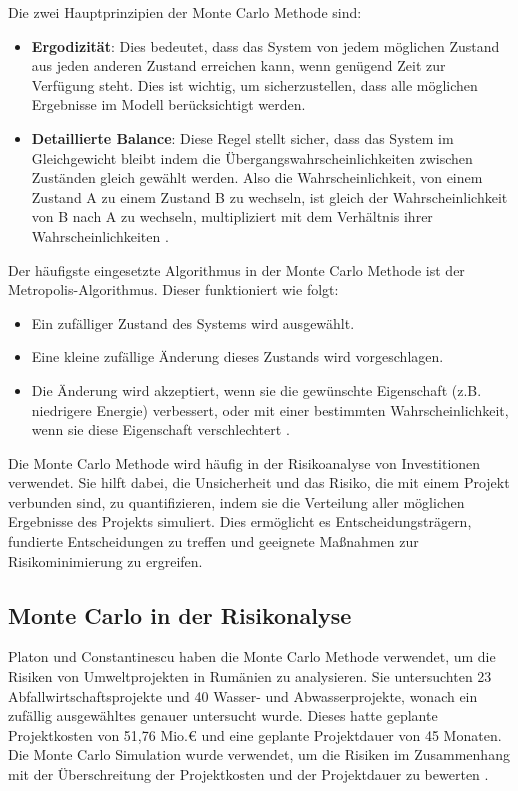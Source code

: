 Die zwei Hauptprinzipien der Monte Carlo Methode sind:

\begin{itemize}
    \item \textbf{Ergodizität}: Dies bedeutet, dass das System von jedem möglichen Zustand aus jeden anderen Zustand erreichen kann, wenn genügend Zeit zur Verfügung steht. Dies ist wichtig, um sicherzustellen, dass alle möglichen Ergebnisse im Modell berücksichtigt werden.
    \item \textbf{Detaillierte Balance}: Diese Regel stellt sicher, dass das System im Gleichgewicht bleibt indem die Übergangswahrscheinlichkeiten zwischen Zuständen gleich gewählt werden. Also die Wahrscheinlichkeit, von einem Zustand A zu einem Zustand B zu wechseln, ist gleich der Wahrscheinlichkeit von B nach A zu wechseln, multipliziert mit dem Verhältnis ihrer Wahrscheinlichkeiten \cite{Walter2014}.
\end{itemize}

Der häufigste eingesetzte Algorithmus in der Monte Carlo Methode ist der Metropolis-Algorithmus. Dieser funktioniert wie folgt:

\begin{itemize}
    \item Ein zufälliger Zustand des Systems wird ausgewählt.
    \item Eine kleine zufällige Änderung dieses Zustands wird vorgeschlagen.
    \item Die Änderung wird akzeptiert, wenn sie die gewünschte Eigenschaft (z.B. niedrigere Energie) verbessert, oder mit einer bestimmten Wahrscheinlichkeit, wenn sie diese Eigenschaft verschlechtert \cite{Walter2014}.
\end{itemize}

Die Monte Carlo Methode wird häufig in der Risikoanalyse von Investitionen verwendet. Sie hilft dabei, die Unsicherheit und das Risiko, die mit einem Projekt verbunden sind, zu quantifizieren, indem sie die Verteilung aller möglichen Ergebnisse des Projekts simuliert. Dies ermöglicht es Entscheidungsträgern, fundierte Entscheidungen zu treffen und geeignete Maßnahmen zur Risikominimierung zu ergreifen.

\subsection{Monte Carlo in der Risikonalyse}

Platon und Constantinescu haben die Monte Carlo Methode verwendet, um die Risiken von Umweltprojekten in Rumänien zu analysieren. Sie untersuchten 23 Abfallwirtschaftsprojekte und 40 Wasser- und Abwasserprojekte, wonach ein zufällig ausgewähltes genauer untersucht wurde. Dieses hatte geplante Projektkosten von 51,76 Mio.€ und eine geplante Projektdauer von 45 Monaten. Die Monte Carlo Simulation wurde verwendet, um die Risiken im Zusammenhang mit der Überschreitung der Projektkosten und der Projektdauer zu bewerten \cite{Platon2014}.

